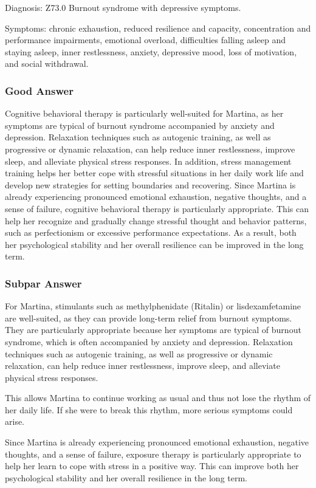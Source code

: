 \documentclass[sigconf,natbib=false]{acmart}
\begin{document}
Diagnosis: Z73.0 Burnout syndrome with depressive symptoms.

Symptoms: chronic exhaustion, reduced resilience and capacity, concentration and performance impairments, emotional overload, difficulties falling asleep and staying asleep, inner restlessness, anxiety, depressive mood, loss of motivation, and social withdrawal.
\subsubsection{Good Answer}
Cognitive behavioral therapy is particularly well-suited for Martina, as her symptoms are typical of burnout syndrome accompanied by anxiety and depression.
Relaxation techniques such as autogenic training, as well as progressive or dynamic relaxation, can help reduce inner restlessness, improve sleep, and alleviate physical stress responses.
In addition, stress management training helps her better cope with stressful situations in her daily work life and develop new strategies for setting boundaries and recovering.
Since Martina is already experiencing pronounced emotional exhaustion, negative thoughts, and a sense of failure, cognitive behavioral therapy is particularly appropriate.
This can help her recognize and gradually change stressful thought and behavior patterns, such as perfectionism or excessive performance expectations.
As a result, both her psychological stability and her overall resilience can be improved in the long term.
\subsubsection{Subpar Answer}
For Martina, stimulants such as methyl\-phenidate (Ritalin) or lisdexamfetamine are well-suited, as they can provide long-term relief from burnout symptoms.
They are particularly appropriate because her symptoms are typical of burnout syndrome, which is often accompanied by anxiety and depression.
Relaxation techniques such as autogenic training, as well as progressive or dynamic relaxation, can help reduce inner restlessness, improve sleep, and alleviate physical stress responses.

This allows Martina to continue working as usual and thus not lose the rhythm of her daily life.
If she were to break this rhythm, more serious symptoms could arise.

Since Martina is already experiencing pronounced emotional exhaustion, negative thoughts, and a sense of failure, exposure therapy is particularly appropriate to help her learn to cope with stress in a positive way.
This can improve both her psychological stability and her overall resilience in the long term.
\end{document}

